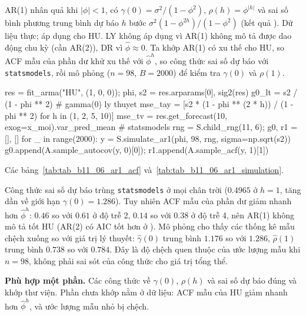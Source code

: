  AR(1) nhân quả khi $|\phi|<1$, có $\gamma(0)=\sigma^2/(1-\phi^2)$, $\rho(h)=\phi^{|h|}$ và sai số bình phương trung bình dự báo $h$ bước $\sigma^2(1-\phi^{2h})/(1-\phi^2)$ (kết quả ).
 Dữ liệu thực; áp dụng cho HU. LY không áp dụng vì AR(1) không mô tả được dao động chu kỳ (cần AR(2)), DR vì $\hat\phi\approx0$. Ta khớp AR(1) có xu thế cho HU, so ACF mẫu của phần dư khử xu thế với $\hat\phi^h$, so công thức sai số dự báo với \texttt{statsmodels}, rồi mô phỏng ($n=98$, $B=2000$) để kiểm tra $\gamma(0)$ và $\rho(1)$.
\begin{codeblock}
res = fit_arma("HU", (1, 0, 0)); phi, s2 = res.arparams[0], sig2(res)
g0_lt = s2 / (1 - phi ** 2)                                   # gamma(0) ly thuyet
mse_tay = [s2 * (1 - phi ** (2 * h)) / (1 - phi ** 2) for h in (1, 2, 5, 10)]
mse_tv = res.get_forecast(10, exog=x_moi).var_pred_mean       # statsmodels
rng = S.child_rng(11, 6); g0, r1 = [], []
for _ in range(2000):
    y = S.simulate_ar1(phi, 98, rng, sigma=np.sqrt(s2))
    g0.append(A.sample_autocov(y, 0)[0]); r1.append(A.sample_acf(y, 1)[1])
\end{codeblock}
 Các bảng~\ref{tab:tab_b11_06_ar1_acf} và~\ref{tab:tab_b11_06_ar1_simulation}.


 Công thức sai số dự báo trùng \texttt{statsmodels} ở mọi chân trời ($0.4965$ ở $h=1$, tăng dần về giới hạn $\gamma(0)=1.286$). Tuy nhiên ACF mẫu của phần dư giảm nhanh hơn $\hat\phi^h$: $0.46$ so với $0.61$ ở độ trễ 2, $0.14$ so với $0.38$ ở độ trễ 4, nên AR(1) không mô tả tốt HU (AR(2) có AIC tốt hơn ở ). Mô phỏng cho thấy các thống kê mẫu chệch xuống so với giá trị lý thuyết: $\hat\gamma(0)$ trung bình $1.176$ so với $1.286$, $\hat\rho(1)$ trung bình $0.738$ so với $0.784$. Đây là độ chệch quen thuộc của ước lượng mẫu khi $n=98$, không phải sai sót của công thức cho giá trị tổng thể.

 \textbf{Phù hợp một phần.} Các công thức về $\gamma(0)$, $\rho(h)$ và sai số dự báo đúng và khớp thư viện. Phần chưa khớp nằm ở dữ liệu: ACF mẫu của HU giảm nhanh hơn $\hat\phi^h$, và ước lượng mẫu nhỏ bị chệch.

